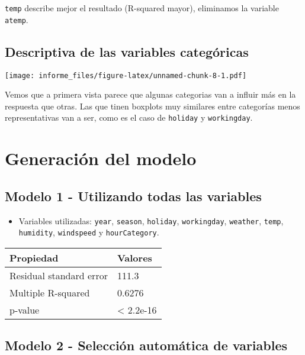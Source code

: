 \documentclass[
]{article}
\providecommand{\tightlist}{%
  \setlength{\itemsep}{0pt}\setlength{\parskip}{0pt}}
\begin{document}
\texttt{temp} describe mejor el resultado (R-squared mayor), eliminamos
la variable \texttt{atemp}.

\hypertarget{descriptiva-de-las-variables-categuxf3ricas}{%
\subsection{Descriptiva de las variables
categóricas}\label{descriptiva-de-las-variables-categuxf3ricas}}

\texttt{[image: informe\_files/figure-latex/unnamed-chunk-8-1.pdf]}

Vemos que a primera vista parece que algunas categorias van a influir
más en la respuesta que otras. Las que tinen boxplots muy similares
entre categorías menos representativas van a ser, como es el caso de
\texttt{holiday} y \texttt{workingday}.

\hypertarget{generaciuxf3n-del-modelo}{%
\section{Generación del modelo}\label{generaciuxf3n-del-modelo}}

\hypertarget{modelo-1---utilizando-todas-las-variables}{%
\subsection{Modelo 1 - Utilizando todas las
variables}\label{modelo-1---utilizando-todas-las-variables}}

\begin{itemize}
\tightlist
\item
  Variables utilizadas: \texttt{year}, \texttt{season},
  \texttt{holiday}, \texttt{workingday}, \texttt{weather},
  \texttt{temp}, \texttt{humidity}, \texttt{windspeed} y
  \texttt{hourCategory}.
\end{itemize}

\begin{longtable}[]{@{}ll@{}}
\toprule
Propiedad & Valores\tabularnewline
\midrule
\endhead
Residual standard error & 111.3\tabularnewline
Multiple R-squared & 0.6276\tabularnewline
p-value & \textless{} 2.2e-16\tabularnewline
\bottomrule
\end{longtable}

\hypertarget{modelo-2---selecciuxf3n-automuxe1tica-de-variables}{%
\subsection{Modelo 2 - Selección automática de
variables}\label{modelo-2---selecciuxf3n-automuxe1tica-de-variables}}
\end{document}
